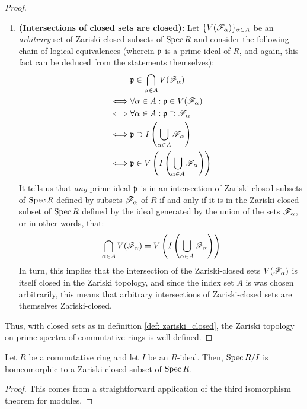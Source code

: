 \begin{proof}
\begin{enumerate}
                            \item \textbf{(Intersections of closed sets are closed):} Let $\{V(\mathscr{F}_{\alpha})\}_{\alpha \in A}$ be an \textit{arbitrary} set of Zariski-closed subsets of $\operatorname{Spec} R$ and consider the following chain of logical equivalences (wherein $\mathfrak{p}$ is a prime ideal of $R$, and again, this fact can be deduced from the statements themselves):
                                $$
                                    \begin{aligned}
                                        & \mathfrak{p} \in \bigcap_{\alpha \in A} V(\mathscr{F}_{\alpha})
                                        \\
                                        \iff & \forall \alpha \in A: \mathfrak{p} \in V(\mathscr{F}_{\alpha})
                                        \\
                                        \iff & \forall \alpha \in A: \mathfrak{p} \supset \mathscr{F}_{\alpha}
                                        \\
                                        \iff & \mathfrak{p} \supset I\left(\bigcup_{\alpha \in A} \mathscr{F}_{\alpha}\right)
                                        \\
                                        \iff & \mathfrak{p} \in V\left(I\left(\bigcup_{\alpha \in A} \mathscr{F}_{\alpha}\right)\right)
                                    \end{aligned}
                                $$
                            It tells us that \textit{any} prime ideal $\mathfrak{p}$ is in an intersection of Zariski-closed subsets of $\operatorname{Spec} R$ defined by subsets $\mathscr{F}_{\alpha}$ of $R$ if and only if it is in the Zariski-closed subset of $\operatorname{Spec} R$ defined by the ideal generated by the union of the sets $\mathscr{F}_{\alpha}$, or in other words, that:
                                $$\bigcap_{\alpha \in A} V(\mathscr{F}_{\alpha}) = V\left(I\left(\bigcup_{\alpha \in A} \mathscr{F}_{\alpha}\right)\right)$$
                            In turn, this implies that the intersection of the Zariski-closed sets $V(\mathscr{F}_{\alpha})$ is itself closed in the Zariski topology, and since the index set $A$ is was chosen arbitrarily, this means that arbitrary intersections of Zariski-closed sets are themselves Zariski-closed.
                        \end{enumerate}
                    Thus, with closed sets as in definition \ref{def: zariski_closed}, the Zariski topology on prime spectra of commutative rings is well-defined.
                \end{proof}
            \begin{corollary} \label{coro: quotients_are_closed}
                Let $R$ be a commutative ring and let $I$ be an $R$-ideal. Then, $\operatorname{Spec} R/I$ is homeomorphic to a Zariski-closed subset of $\operatorname{Spec} R$. 
            \end{corollary}
                \begin{proof}
                    This comes from a straightforward application of the third isomorphism theorem for modules.
                \end{proof}
                
